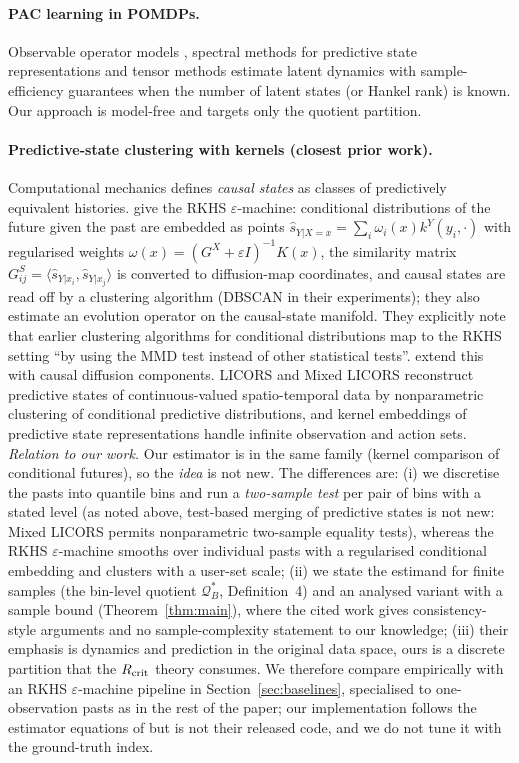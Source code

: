 \documentclass[10pt]{article}
\newcommand{\Qstar}{\mathcal{Q}^*}
\begin{document}
\paragraph{PAC learning in POMDPs.}
Observable operator models \citep{Jaeger2000}, spectral methods for predictive state representations \citep{Boots2011} and
tensor methods \citep{Azizzadenesheli2016} estimate latent dynamics with
sample-efficiency guarantees when the number of latent states (or Hankel rank)
is known.  Our approach is model-free and targets only the quotient partition.

\paragraph{Predictive-state clustering with kernels (closest prior work).}
Computational mechanics defines \emph{causal states} as classes of predictively
equivalent histories.  \citet{Brodu2022} give the RKHS $\varepsilon$-machine:
conditional distributions of the future given the past are embedded as points
$\hat s_{Y|X=x}=\sum_i\omega_i(x)k^Y(y_i,\cdot)$ with regularised weights
$\omega(x)=(G^X+\varepsilon I)^{-1}K(x)$, the similarity matrix
$G^S_{ij}=\langle\hat s_{Y|x_i},\hat s_{Y|x_j}\rangle$ is converted to
diffusion-map coordinates, and causal states are read off by a clustering
algorithm (DBSCAN in their experiments); they also estimate an evolution
operator on the causal-state manifold.  They explicitly note that earlier
clustering algorithms for conditional distributions map to the RKHS setting
``by using the MMD test instead of other statistical tests''.  \citet{Jurgens2024}
extend this with causal diffusion components.  LICORS and Mixed LICORS
\citep{Goerg2012,Goerg2013} reconstruct predictive states of continuous-valued
spatio-temporal data by nonparametric clustering of conditional predictive
distributions, and kernel embeddings of predictive state representations
\citep{Boots2013} handle infinite observation and action sets.
\emph{Relation to our work.}  Our estimator is in the same family (kernel
comparison of conditional futures), so the \emph{idea} is not new.  The
differences are: (i) we discretise the pasts into quantile bins and run a
\emph{two-sample test} per pair of bins with a stated level (as noted above,
test-based merging of predictive states is not new: Mixed LICORS permits
nonparametric two-sample equality tests), whereas the
RKHS $\varepsilon$-machine smooths over individual pasts with a regularised
conditional embedding and clusters with a user-set scale; (ii) we state the
estimand for finite samples (the bin-level quotient $\Qstar_B$, Definition~4)
and an analysed variant with a sample bound (Theorem~\ref{thm:main}), where the
cited work gives consistency-style arguments and no sample-complexity statement
to our knowledge; (iii) their emphasis is dynamics and prediction in the
original data space, ours is a discrete partition that the $R_{\rm crit}$
theory consumes.  We therefore compare empirically with an RKHS
$\varepsilon$-machine pipeline in Section~\ref{sec:baselines}, specialised to
one-observation pasts as in the rest of the paper; our implementation follows
the estimator equations of \citet{Brodu2022} but is not their released code,
and we do not tune it with the ground-truth index.
\end{document}
